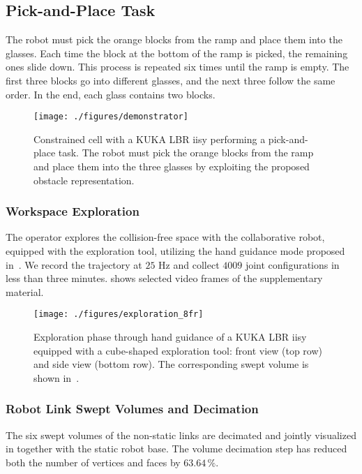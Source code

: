 \subsection{Pick-and-Place Task}
\label{subsec:pickAndPlaceTask}
The robot must pick the orange blocks from the ramp and place them into the glasses. 
Each time the block at the bottom of the ramp is picked, 
the remaining ones slide down. 
This process is repeated six times until the ramp is empty. 
The first three blocks go into different glasses, 
and the next three follow the same order. 
In the end, 
each glass contains two blocks.

\begin{figure}[!t]
	\centering
	\texttt{[image: ./figures/demonstrator]}
	\caption{Constrained cell with a KUKA LBR iisy performing a pick-and-place task. 
	The robot must pick the orange blocks from the ramp and place them into the three glasses 
	by exploiting the proposed obstacle representation.}
	\label{fig:demonstrator}
\end{figure}

\subsubsection{Workspace Exploration}
The operator explores the collision-free space with the collaborative robot, 
equipped with the exploration tool, 
utilizing the hand guidance mode proposed in~\cite{osorio2019physical}.
We record the trajectory at $25$ Hz 
and collect $4009$ joint configurations in less than three minutes.
 shows selected video frames of the supplementary material.

\begin{figure*}[!t]
	\centering
	\texttt{[image: ./figures/exploration\_8fr]}
	\caption{Exploration phase through hand guidance of a KUKA LBR iisy equipped 
	with a cube-shaped exploration tool: 
	front view (top row) and side view (bottom row).
	The corresponding swept volume is shown in~.}
	\label{fig:exploration_frames}
\end{figure*}

\subsubsection{Robot Link Swept Volumes and Decimation}
The six swept volumes of the non-static links are decimated and jointly visualized in  together with the static robot base.
The volume decimation step has reduced both the number of vertices and faces by $63.64 \,\%$.

